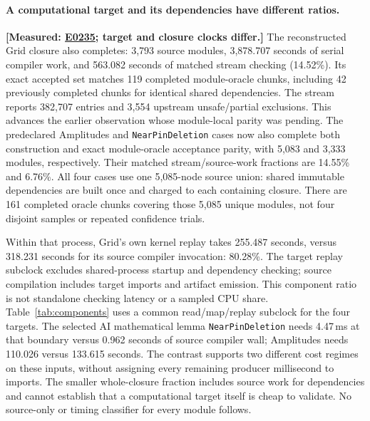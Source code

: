 \documentclass[10pt,twocolumn]{article}
\newcommand{\measured}[1]{\textbf{[Measured: #1]}}
\newcommand{\expref}[2]{\href{https://github.com/yunwei37/proofserve/blob/main/docs/tmp/build-and-evaluate/step-#1/step-report.md}{E#2}}
\begin{document}
\paragraph{A computational target and its dependencies have different ratios.}
\measured{\expref{0235-20261101T041713+0000}{0235}; target and closure clocks differ.}
The reconstructed Grid closure also completes: 3,793 source modules,
3,878.707 seconds of serial compiler work, and 563.082 seconds of matched
stream checking (14.52\%).
Its exact accepted set matches 119 completed module-oracle chunks, including
42 previously completed chunks for identical shared dependencies.
The stream reports 382,707 entries and 3,554 upstream unsafe/partial exclusions.
This advances the earlier observation whose module-local parity was pending.
The predeclared Amplitudes and \texttt{NearPinDeletion} cases now also
complete both construction and exact module-oracle acceptance parity,
with 5,083 and 3,333 modules, respectively.
Their matched stream/source-work fractions are 14.55\% and 6.76\%.
All four cases use one 5,085-node source union: shared immutable dependencies
are built once and charged to each containing closure.
There are 161 completed oracle chunks covering those 5,085 unique modules,
not four disjoint samples or repeated confidence trials.

Within that process, Grid's own kernel replay takes 255.487 seconds, versus
318.231 seconds for its source compiler invocation: 80.28\%.
The target replay subclock excludes shared-process startup and dependency
checking; source compilation includes target imports and artifact emission.
This component ratio is not standalone checking latency or a sampled CPU share.
Table~\ref{tab:components} uses a common read/map/replay subclock for the
four targets. The selected AI mathematical lemma \texttt{NearPinDeletion}
needs 4.47\,ms at that boundary versus 0.962 seconds of source compiler
wall; Amplitudes needs 110.026 versus 133.615 seconds.
The contrast supports two different cost regimes on these inputs, without
assigning every remaining producer millisecond to imports.
The smaller whole-closure fraction includes source work for dependencies
and cannot establish that a computational target itself is cheap to validate.
No source-only or timing classifier for every module follows.
\end{document}
